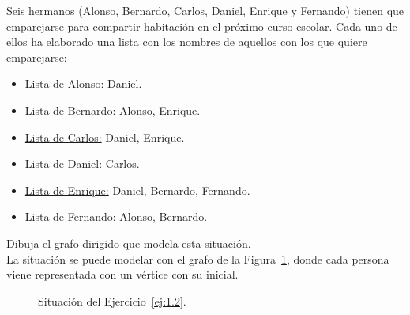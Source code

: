 \begin{ejercicio}\label{ej:1.2}
    Seis hermanos (Alonso, Bernardo, Carlos, Daniel, Enrique y Fernando) tienen que emparejarse para compartir habitación en el próximo curso escolar. Cada uno de ellos ha elaborado una lista con los nombres de aquellos con los que quiere emparejarse:
    \begin{itemize}
        \item \ul{Lista de Alonso:} Daniel.
        \item \ul{Lista de Bernardo:} Alonso, Enrique.
        \item \ul{Lista de Carlos:} Daniel, Enrique.
        \item \ul{Lista de Daniel:} Carlos.
        \item \ul{Lista de Enrique:} Daniel, Bernardo, Fernando.
        \item \ul{Lista de Fernando:} Alonso, Bernardo.
    \end{itemize}
    Dibuja el grafo dirigido que modela esta situación.\\

    La situación se puede modelar con el grafo de la Figura~\ref{fig:1.2}, donde cada persona viene representada con un vértice con su inicial.
    \begin{figure}
        \centering
        \caption{Situación del Ejercicio~\ref{ej:1.2}.}
        \label{fig:1.2}
    \end{figure}


\end{ejercicio}
